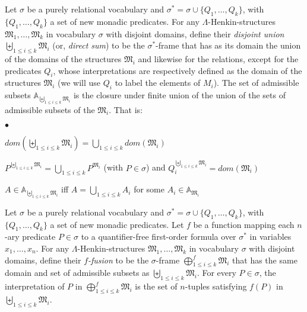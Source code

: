 \documentclass{LMCS}
\newcommand{\frM}{\mathfrak{M}}
\begin{document}
\begin{defi}
  Let $\sigma$ be a purely relational vocabulary and $\sigma^* = \sigma \cup \{Q_1, \ldots, Q_k\}$,
  with $\{Q_1, \ldots, Q_k\}$ a set of new  monadic predicates.
  For any $\Lambda$-Henkin-structures $\frM_1, \ldots, \frM_k$ in vocabulary $\sigma$ with disjoint domains,
  define their \emph{disjoint union} $\biguplus_{ 1 \leq i \leq k} \frM_i$ (or, \emph{direct sum})
  to be the $\sigma^*$-frame that
  has as its domain the union of the domains of the structures $\frM_i$ and likewise for the relations, except for
  the predicates $Q_i$, whose interpretations are
  respectively defined as the domain of the structures $\frM_i$ (we will use $Q_i$ to label the elements of $M_i$).
  The set of admissible subsets $\mathbb{A}_{\biguplus_{1\leq i\leq k}\frM_i}$ is the closure under finite union of the union of the sets of
  admissible subsets of the $\frM_i$. That is:
  \begin{iteMize}{$\bullet$}
    \item   $dom(\biguplus_{ 1 \leq i \leq k} \frM_i)=\bigcup_{ 1 \leq i \leq k} dom(\frM_i)$
    \item   $P^{\biguplus_{ 1 \leq i \leq k}
    \frM_i}=\bigcup_{ 1 \leq i \leq k} P^{\frM_i}$ (with $P \in \sigma$) and $Q_i^{\biguplus_{ 1 \leq i \leq k}
    \frM_i}=dom(\frM_i)$
    \item   $A \in \mathbb{A}_{\biguplus_{1\leq i\leq k}\frM_i}$ iff $A= \bigcup_{1\leq i\leq k} A_i$ for some $A_i
    \in \mathbb{A}_{\frM_i}$
  \end{iteMize}
\label{union}
  \end{defi}

\begin{defi}
Let $\sigma$ be a purely relational vocabulary and $\sigma^* = \sigma \cup \{Q_1, \ldots, Q_k\}$,
with $\{Q_1, \ldots, Q_k\}$ a set of new  monadic predicates.
Let $f$ be a function mapping each $n$-ary predicate $P \in
\sigma$ to a quantifier-free first-order formula over $\sigma^*$ in variables
$x_1,\ldots,x_n$. For any $\Lambda$-Henkin-structures
$\frM_1, \ldots, \frM_k$ in vocabulary $\sigma$ with disjoint domains, define their
\emph{$f$-fusion} to be the $\sigma$-frame $\bigoplus_{1
\leq i \leq k}^f \frM_i$ that has the same domain and set of
admissible subsets as $\biguplus_{1 \leq i \leq k} \frM_i$.
For every $P\in \sigma$, the interpretation of $P$ in
$\bigoplus_{1 \leq i \leq k}^f \frM_i$ is the set of
$n$-tuples satisfying $f(P)$ in
$\biguplus_{1\leq i\leq k} \frM_i$.
\label{fusion}
\end{defi}
\end{document}
